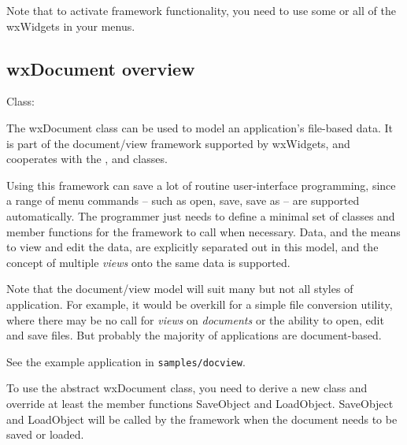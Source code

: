 Note that to activate framework functionality, you need to use some or all of
the wxWidgets  in your menus.


\subsection{wxDocument overview}\label{wxdocumentoverview}


Class: 

The wxDocument class can be used to model an application's file-based
data. It is part of the document/view framework supported by wxWidgets,
and cooperates with the , \rtfsp
and  classes.

Using this framework can save a lot of routine user-interface programming,
since a range of menu commands -- such as open, save, save as -- are supported automatically.
The programmer just needs to define a minimal set of classes and member functions
for the framework to call when necessary. Data, and the means to view and edit
the data, are explicitly separated out in this model, and the concept of multiple {\it views} onto
the same data is supported.

Note that the document/view model will suit many but not all styles of application.
For example, it would be overkill for a simple file conversion utility, where there
may be no call for {\it views} on {\it documents} or the ability to open, edit and save
files. But probably the majority of applications are document-based.

See the example application in {\tt samples/docview}.

To use the abstract wxDocument class, you need to derive a new class and override
at least the member functions SaveObject and LoadObject. SaveObject and
LoadObject will be called by the framework when the document needs to be saved
or loaded.

